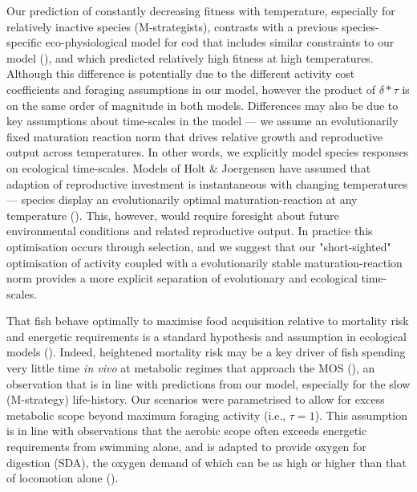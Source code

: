 \documentclass[a4paper, toc=index,abstract=true]{scrartcl}\usepackage[]{graphicx}\usepackage[]{color}
\begin{document}
\begin{spacing}{1.9}
Our prediction of constantly decreasing fitness with temperature, especially for relatively inactive species (M-strategists), contrasts with a previous species-specific eco-physiological model for cod that includes similar constraints to our model (\cite{holt_climate_2014,holt_climate_2015}), and which predicted relatively high fitness at high temperatures. Although this difference is potentially due to the different activity cost coefficients and foraging assumptions in our model, however the product of $\delta*\tau$ is on the same order of magnitude in both models. Differences may also be due to key assumptions about time-scales in the model --- we assume an evolutionarily fixed maturation reaction norm that drives relative growth and reproductive output across temperatures. In other words, we explicitly model species responses on ecological time-scales. Models of Holt \& Joergensen have assumed that adaption of reproductive investment is instantaneous with changing temperatures --- species display an evolutionarily optimal maturation-reaction at any temperature (\cite{holt_climate_2014,holt_climate_2015}). This, however, would require foresight about future environmental conditions and related reproductive output. In practice this optimisation occurs through selection, and we suggest that our "short-sighted" optimisation of activity coupled with a evolutionarily stable maturation-reaction norm provides a more explicit separation of evolutionary and ecological time-scales. 

That fish behave optimally to maximise food acquisition relative to mortality risk and energetic requirements is a standard hypothesis and assumption in ecological models (\cite{gilliam_habitat_1987,sainmont_effective_2015,priede_natural_1977, claireaux_influence_2000,hufnagl_physiological_2011}). Indeed, heightened mortality risk may be a key driver of fish spending very little time \emph{in vivo} at metabolic regimes that approach the MOS (\cite{priede_natural_1977}), an observation that is in line with predictions from our model, especially for the slow (M-strategy) life-history. Our scenarios were parametrised to allow for excess metabolic scope beyond maximum foraging activity (i.e., $\tau=1$). This assumption is in line with observations that the aerobic scope often exceeds energetic requirements from swimming alone, and is adapted to provide oxygen for digestion (SDA), the oxygen demand of which can be as high or higher than that of locomotion alone (\cite{priede_metabolic_1985}).


\end{spacing}
\end{document}
